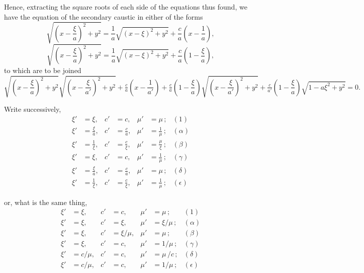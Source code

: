 \documentclass[11pt,a4paper]{article}
\theoremstyle{definition}
\begin{document}
\medskip

Hence, extracting the square roots of each side of the equations thus found, we
have the equation of the secondary caustic in either of the forms
\[
\sqrt{\left(x-\frac{\xi}{a}\right)^2+y^2}=\frac{1}{a}\sqrt{(x-\xi)^2+y^2}+\frac{c}{a}\left(x-\frac{1}{a}\right),
\]
\[
\sqrt{\left(x-\frac{\xi}{a}\right)^2+y^2}=\frac{1}{a}\sqrt{(x-\xi)^2+y^2}+\frac{c}{a}\left(1-\frac{\xi}{a}\right),
\]
to which are to be joined
\[
\sqrt{\left(x-\frac{\xi}{a}\right)^2+y^2}\sqrt{\left(x-\frac{\xi}{a'}\right)^2+y^2}+\tfrac{c}{a}\left(x-\frac{1}{a'}\right)
+ \tfrac{c}{a}\left(1-\frac{\xi}{a}\right)\sqrt{\left(x-\frac{\xi}{a'}\right)^2+y^2}+\tfrac{c}{a'}\left(1-\frac{\xi}{a}\right)\sqrt{1-a\xi^2+y^2}=0.
\]

\medskip

Write successively,
\begin{align*}
\xi' &= \xi, & c' &= c, & \mu' &= \mu \,; & (1) \\
\xi' &= \frac{\xi}{a}, & c' &= \frac{c}{a}, & \mu' &= \frac{1}{\mu} \,; & (\alpha) \\
\xi' &= \frac{1}{\xi}, & c' &= \frac{c}{\xi}, & \mu' &= \frac{\mu}{\xi} \,; & (\beta) \\
\xi' &= \xi, & c' &= c, & \mu' &= \frac{1}{\mu} \,; & (\gamma) \\
\xi' &= \frac{\xi}{a}, & c' &= \frac{c}{a}, & \mu' &= \mu \,; & (\delta) \\
\xi' &= \frac{1}{\xi}, & c' &= \frac{c}{\xi}, & \mu' &= \frac{1}{\mu} \,; & (\epsilon)
\end{align*}

\medskip

or, what is the same thing,
\begin{align*}
\xi' &= \xi, & c' &= c, & \mu' &= \mu \,; & (1) \\
\xi' &= \xi, & c' &= \xi, & \mu' &= \xi/\mu \,; & (\alpha) \\
\xi' &= \xi, & c' &= \xi/\mu, & \mu' &= \mu \,; & (\beta) \\
\xi' &= \xi, & c' &= c, & \mu' &= 1/\mu \,; & (\gamma) \\
\xi' &= c/\mu, & c' &= c, & \mu' &= \mu\,/c \,; & (\delta) \\
\xi' &= c/\mu, & c' &= c, & \mu' &= 1/\mu \,; & (\epsilon)
\end{align*}

\medskip
\end{document}
